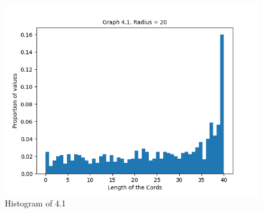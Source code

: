 \documentclass[answers]{exam}
\begin{document}
    \begin{figure}[ht]
        \caption{Histogram of 4.1}
        \centering
        \includegraphics[scale=0.7]{Q4/Q4(1).png}
    \end{figure}
\newpage
\end{document}
